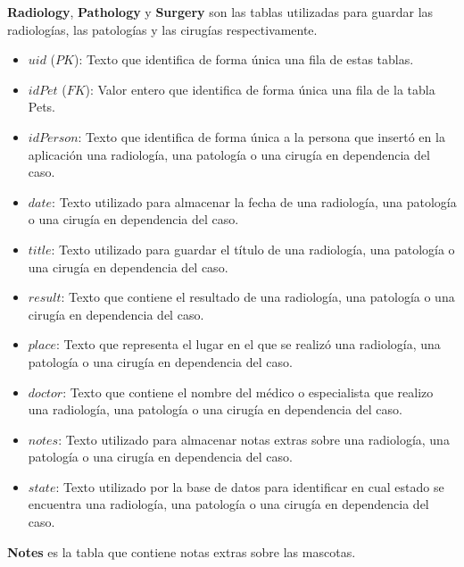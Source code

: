 \textbf{Radiology}, \textbf{Pathology} y \textbf{Surgery} son las tablas utilizadas para guardar las radiologías, las patologías y las cirugías respectivamente.


\begin{itemize}
\item	$uid$ ($PK$): Texto que identifica de forma única una fila de estas tablas.
\item	$idPet$ ($FK$): Valor entero que identifica de forma única una fila de la tabla Pets.
\item	$idPerson$: Texto que identifica de forma única a la persona que insertó en la aplicación una radiología, una patología o una cirugía en dependencia del caso.
\item	$date$: Texto utilizado para almacenar la fecha de una radiología, una patología o una cirugía en dependencia del caso.
\item	$title$: Texto utilizado para guardar el título de una radiología, una patología o una cirugía en dependencia del caso.
\item	$result$: Texto que contiene el resultado de una radiología, una patología o una cirugía en dependencia del caso.
\item	$place$: Texto que representa el lugar en el que se realizó una radiología, una patología o una cirugía en dependencia del caso.
\item	$doctor$: Texto que contiene el nombre del médico o especialista que realizo una radiología, una patología o una cirugía en dependencia del caso.
\item	$notes$: Texto utilizado para almacenar notas extras sobre una radiología, una patología o una cirugía en dependencia del caso.
\item	$state$: Texto utilizado por la base de datos para identificar en cual estado se encuentra una radiología, una patología o una cirugía en dependencia del caso.
\end{itemize}


\textbf{Notes} es la tabla que contiene notas extras sobre las mascotas.


